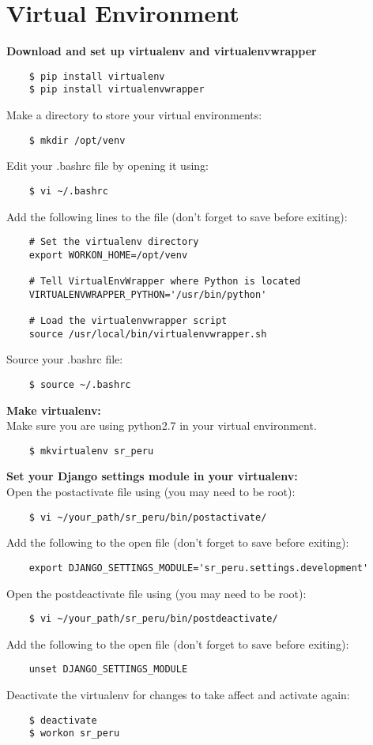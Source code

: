 \documentclass{article}
\begin{document}
\section{Virtual Environment}
\textbf{Download and set up virtualenv and virtualenvwrapper}
\begin{verbatim}
    $ pip install virtualenv
    $ pip install virtualenvwrapper
\end{verbatim}
Make a directory to store your virtual environments:
\begin{verbatim}
    $ mkdir /opt/venv
\end{verbatim}
Edit your .bashrc file by opening it using:
\begin{verbatim}
    $ vi ~/.bashrc
\end{verbatim}
Add the following lines to the file (don't forget to save before exiting):
\begin{verbatim}
    # Set the virtualenv directory
    export WORKON_HOME=/opt/venv
    
    # Tell VirtualEnvWrapper where Python is located
    VIRTUALENVWRAPPER_PYTHON='/usr/bin/python'
    
    # Load the virtualenvwrapper script
    source /usr/local/bin/virtualenvwrapper.sh
\end{verbatim}
Source your .bashrc file:
\begin{verbatim}
    $ source ~/.bashrc
\end{verbatim}
\textbf{Make virtualenv:}
\\Make sure you are using python2.7 in your virtual environment.
\begin{verbatim}
    $ mkvirtualenv sr_peru
\end{verbatim}
\textbf{Set your Django settings module in your virtualenv:}
\\Open the postactivate file using (you may need to be root):
\begin{verbatim}
    $ vi ~/your_path/sr_peru/bin/postactivate/
\end{verbatim}
Add the following to the open file (don't forget to save before exiting):
\begin{verbatim}
    export DJANGO_SETTINGS_MODULE='sr_peru.settings.development'
\end{verbatim}
Open the postdeactivate file using (you may need to be root):
\begin{verbatim}
    $ vi ~/your_path/sr_peru/bin/postdeactivate/
\end{verbatim}
Add the following to the open file (don't forget to save before exiting):
\begin{verbatim}
    unset DJANGO_SETTINGS_MODULE
\end{verbatim}
Deactivate the virtualenv for changes to take affect and activate again:
\begin{verbatim}
    $ deactivate
    $ workon sr_peru
\end{verbatim}
\end{document}
